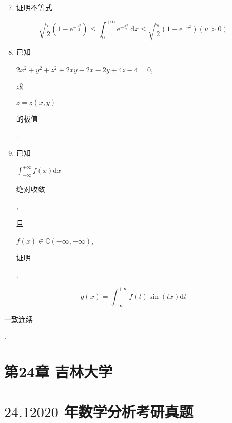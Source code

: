 \documentclass[10pt]{article}
\begin{document}
\begin{enumerate}
  \setcounter{enumi}{6}
  \item \begin{CJK}{UTF8}{mj}证明不等式\end{CJK}
\end{enumerate}
$$
\sqrt{\frac{\pi}{2}\left(1-\mathrm{e}^{-\frac{u^{2}}{2}}\right)} \leq \int_{0}^{+\infty} \mathrm{e}^{-\frac{x^{2}}{2}} \mathrm{~d} x \leq \sqrt{\frac{\pi}{2}\left(1-\mathrm{e}^{-u^{2}}\right)(u>0)}
$$

\begin{enumerate}
  \setcounter{enumi}{7}
  \item \begin{CJK}{UTF8}{mj}已知\end{CJK} $2 x^{2}+y^{2}+z^{2}+2 x y-2 x-2 y+4 z-4=0$, \begin{CJK}{UTF8}{mj}求\end{CJK} $z=z(x, y)$ \begin{CJK}{UTF8}{mj}的极值\end{CJK}.

  \item \begin{CJK}{UTF8}{mj}已知\end{CJK} $\int_{-\infty}^{+\infty} f(x) \mathrm{d} x$ \begin{CJK}{UTF8}{mj}绝对收敛\end{CJK}, \begin{CJK}{UTF8}{mj}且\end{CJK} $f(x) \in \mathbb{C}(-\infty,+\infty)$, \begin{CJK}{UTF8}{mj}证明\end{CJK}:

\end{enumerate}
$$
g(x)=\int_{-\infty}^{+\infty} f(t) \sin (t x) \mathrm{d} t
$$
\begin{CJK}{UTF8}{mj}一致连续\end{CJK}.

\section{第24章 吉林大学}
\section{$24.12020$ 年数学分析考研真题}
\end{document}
